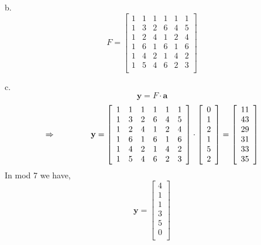 \documentclass[11pt]{article}
\begin{document}
\begin{itemize}
b.\\
 \[
   F=
  \left[ {\begin{array}{cccccc}
   1 & 1 & 1 & 1 & 1 & 1\\
   1 & 3 & 2 & 6 & 4 & 5\\
   1 & 2 & 4 & 1 & 2 & 4\\
   1 & 6 & 1 & 6 & 1 & 6\\
   1 & 4 & 2 & 1 & 4 & 2\\
   1 & 5 & 4 & 6 & 2 & 3\\
  \end{array} } \right]
\]

c.\\
$$\textbf{y} = F \cdot \textbf{a}$$
 \[
   \Rightarrow \hspace{1.5cm} \textbf{y} =
  \left[ {\begin{array}{cccccc}
   1 & 1 & 1 & 1 & 1 & 1\\
   1 & 3 & 2 & 6 & 4 & 5\\
   1 & 2 & 4 & 1 & 2 & 4\\
   1 & 6 & 1 & 6 & 1 & 6\\
   1 & 4 & 2 & 1 & 4 & 2\\
   1 & 5 & 4 & 6 & 2 & 3\\
  \end{array} } \right]
  \cdot 
    \left[ {\begin{array}{c}
   0\\
   1\\
   2\\
   1\\
   5\\
   2\\
  \end{array} } \right]
   	= 
	\left[ {\begin{array}{c}
  	 11\\
 	  43\\
  	 29\\
  	 31\\
  	 33\\
  	 35\\
  \end{array} } \right]
    \]
In mod 7 we have, 
   \[
	\textbf{y} =
      \left[ {\begin{array}{c}
   4\\
   1\\
   1\\
   3\\
   5\\
   0\\
  \end{array} } \right]
\]


\end{itemize}
\end{document}
